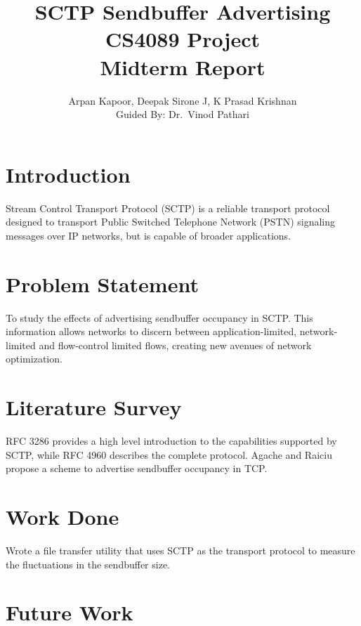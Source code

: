 \documentclass[a4paper,11pt,twocolumn]{article}
\title{SCTP Sendbuffer Advertising\\
	{\normalsize CS4089 Project\\
		Midterm Report}}
\author{Arpan Kapoor, Deepak Sirone J, K Prasad Krishnan\\
	Guided By: Dr.~Vinod Pathari}
\begin{document}
\maketitle

\section{Introduction}
Stream Control Transport Protocol (SCTP) is a reliable transport protocol
designed to transport Public Switched Telephone Network (PSTN) signaling
messages over IP networks, but is capable of broader applications.

\section{Problem Statement}
To study the effects of advertising sendbuffer occupancy in SCTP. This
information allows networks to discern between application-limited,
network-limited and flow-control limited flows, creating new avenues of network
optimization.

\section{Literature Survey}
RFC 3286 \cite{rfc3286} provides a high level introduction to the capabilities
supported by SCTP, while RFC 4960 \cite{rfc4960} describes the complete
protocol. Agache and Raiciu \cite{tcp-sndbufadv} propose a scheme to advertise
sendbuffer occupancy in TCP.

\section{Work Done}
Wrote a file transfer utility that uses SCTP as the transport protocol to
measure the fluctuations in the sendbuffer size.

\section{Future Work}

\printbibliography
\end{document}
